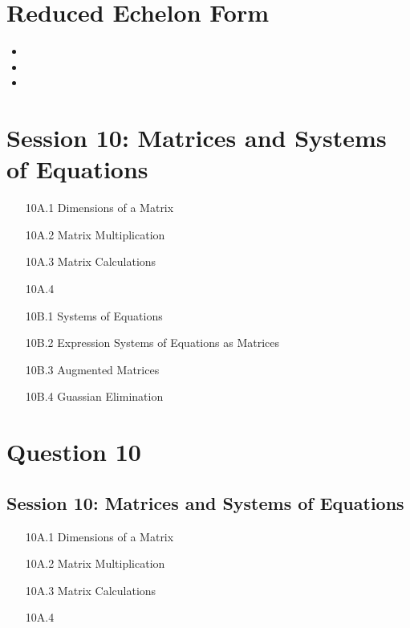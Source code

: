\documentclass[]{report}
\begin{document}
{{{{{{\section*{Reduced Echelon Form}

\begin{itemize}
\item
\item
\item
\end{itemize}


\section*{Session 10: Matrices and Systems of Equations}
\begin{itemize}
\item[10A.1] Dimensions of a Matrix
\item[10A.2] Matrix Multiplication
\item[10A.3] Matrix Calculations
\item[10A.4] 
\end{itemize}

\begin{itemize}
\item[10B.1] Systems of Equations
\item[10B.2] Expression Systems of Equations as Matrices
\item[10B.3] Augmented Matrices
\item[10B.4] Guassian Elimination
\end{itemize}



















\section*{Question 10}

\subsection*{Session 10: Matrices and Systems of Equations}
\begin{itemize}
\item[10A.1] Dimensions of a Matrix
\item[10A.2] Matrix Multiplication
\item[10A.3] Matrix Calculations
\item[10A.4] 
\end{itemize}

}}}}}}
\end{document}
